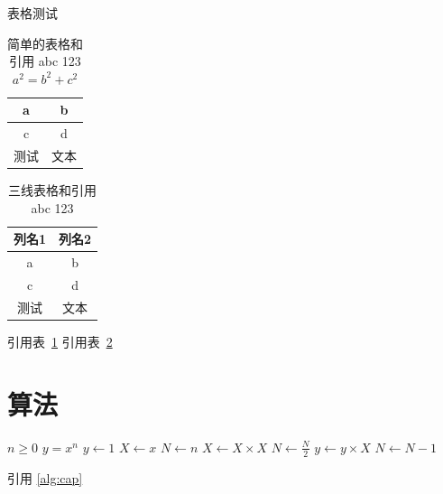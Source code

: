 表格测试
\begin{table}[!h]
    \centering
    \caption{%
        简单的表格和引用 abc 123 $a^2=b^2+c^2$\the\baselineskip %
    }
    \label{table:简单的表格}
    \begin{tabular}{cc}
        \hline
        a  & b  \\ \hline
        c  & d  \\ \hline
        测试 & 文本 \\ \hline
    \end{tabular}
\end{table}
\begin{table}[!h]
    \centering
    \caption{%
        三线表格和引用 abc 123 %
    }
    \label{table:三线表格}
    \begin{tabular}{cc}
        \toprule
        列名1 & 列名2 \\ \midrule
        a   & b   \\
        c   & d   \\
        测试  & 文本  \\ \bottomrule
    \end{tabular}
\end{table}

引用表~\ref{table:简单的表格}
引用表~\ref{table:三线表格}

\section{算法}
\begin{algorithm}[!h]
    \caption{An algorithm with caption} \label{alg:cap}
    \begin{algorithmic}
        \Require $n \geq 0$
        \Ensure $y = x^n$
        \State $y \gets 1$
        \State $X \gets x$
        \State $N \gets n$
        \State $X \gets X \times X$
        \State $N \gets \frac{N}{2}$  
        \State $y \gets y \times X$
        \State $N \gets N - 1$
        \EndIf
        \EndWhile
    \end{algorithmic}
\end{algorithm}

引用 \autoref{alg:cap}